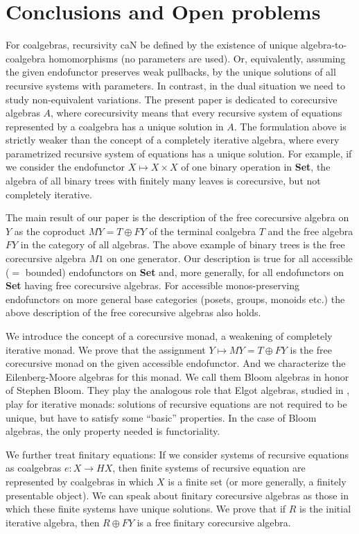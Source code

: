 \documentclass{LMCS}
\theoremstyle{plain}
\theoremstyle{definition}
\numberwithin{equation}{section}
\begin{document}
\section{Conclusions and Open problems}

For coalgebras, recursivity caN be defined by the existence of unique algebra-to-coalgebra homomorphisms (no parameters are used). Or, equivalently, assuming the given endofunctor preserves weak pullbacks, by the unique solutions of all recursive systems with parameters. In contrast, in the dual situation we need to study non-equivalent variations. The present paper is dedicated to corecursive algebras $A$, where corecursivity means that  every recursive system of equations represented by a coalgebra has a unique solution in $A$. The formulation above is strictly weaker than the concept of a completely iterative algebra, where every parametrized recursive system of equations has a unique solution. For example, if we consider the endofunctor $X\mapsto X\times X$ of one binary operation in {\bf Set}, the algebra of all binary trees with finitely many leaves is corecursive, but not completely iterative.

The main result of our paper is the description of the free
corecursive algebra on $Y$ as the coproduct $MY=T\oplus FY$ of the
terminal coalgebra $T$ and the free algebra $FY$ in the category of all
algebras. The above example of binary trees is the free corecursive
algebra $M1$ on one generator. Our description is true for all
accessible ($=$ bounded)  endofunctors on {\bf Set} and, more generally, for
all endofunctors on {\bf Set} having free corecursive algebras. For
accessible monos-preserving endofunctors on more general base categories (posets, groups,
monoids etc.) the above description of the free corecursive algebras
also holds.

We introduce the concept of a corecursive monad, a weakening of
completely iterative monad. We prove that the assignment $Y\mapsto
MY=T\oplus FY$ is the free corecursive monad on the given accessible
endofunctor. And we characterize the Eilenberg-Moore algebras for this
monad. We call them Bloom algebras in honor of Stephen Bloom. They
play the analogous role that Elgot algebras, studied in \cite{amv3},
play for iterative monads: solutions of recursive equations are not
required to be unique, but have to satisfy some ``basic''
properties. In the case of Bloom algebras, the only property needed is
functoriality.

We further treat finitary equations: If we consider systems of
recursive equations as coalgebras $e:X\rightarrow HX$, then finite
systems of recursive equation are represented by coalgebras in which
$X$ is a finite set (or more generally, a finitely presentable
object). We can speak about finitary corecursive algebras as those in
which these finite systems have unique solutions. We prove that if $R$
is the initial iterative algebra, then $R \oplus FY$ is a free
finitary corecursive algebra.
\end{document}
